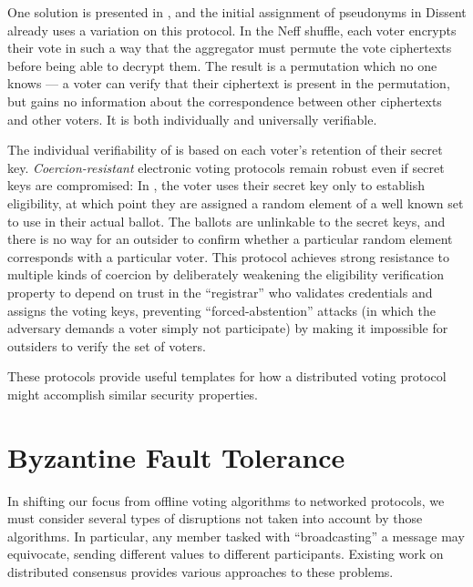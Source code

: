     One solution is presented in \cite{neff}, and the initial assignment of
    pseudonyms in Dissent already uses a variation on this protocol. In the Neff
    shuffle, each voter encrypts their vote in such a way that the aggregator
    must permute the vote ciphertexts before being able to decrypt them. The
    result is a permutation which no one knows --- a voter can verify that their
    ciphertext is present in the permutation, but gains no information about the
    correspondence between other ciphertexts and other voters. It is both
    individually and universally verifiable.

    The individual verifiability of \cite{neff} is based on each
    voter's retention of their secret key. \emph{Coercion-resistant} electronic
    voting protocols remain robust even if secret keys are compromised: In
    \cite{juels_coercion-resistant_2005}, the voter uses their secret key only
    to establish eligibility, at which point they are assigned a random element
    of a well known set to use in their actual ballot. The ballots are
    unlinkable to the secret keys, and there is no way for an outsider to
    confirm whether a particular random element corresponds with a particular
    voter. This protocol achieves strong resistance to multiple kinds of
    coercion by deliberately weakening the eligibility verification property to
    depend on trust in the ``registrar'' who validates credentials and assigns
    the voting keys, preventing ``forced-abstention'' attacks (in which the
    adversary demands a voter simply not participate) by making it impossible
    for outsiders to verify the set of voters.

    These protocols provide useful templates for how a distributed voting
    protocol might accomplish similar security properties.

  \section{Byzantine Fault Tolerance}
    In shifting our focus from offline voting algorithms to networked protocols,
    we must consider several types of disruptions not taken into account by
    those algorithms. In particular, any member tasked with ``broadcasting'' a
    message may equivocate, sending different values to different participants.
    Existing work on distributed consensus provides various approaches to these
    problems.

